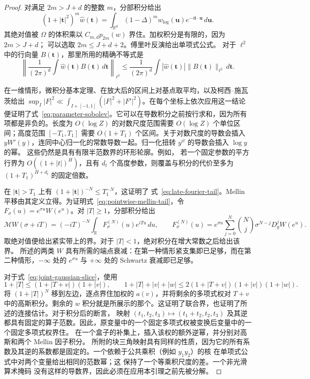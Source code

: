\documentclass[11pt,a4paper]{article}
\numberwithin{equation}{section}
\numberwithin{figure}{section}
\theoremstyle{definition}
\theoremstyle{remark}
\begin{document}
\begin{proof}
对满足 $2m>J+d$ 的整数 $m$，分部积分给出
\[
 (1+|\boldsymbol t|^2)^m\widehat w(\boldsymbol t)
 =\int_{\mathbb R^d}(1-\Delta)^m w_{\log}(\boldsymbol u)
                       e^{-i\boldsymbol t\cdot\boldsymbol u}\,d\boldsymbol u.
\]
其绝对值被 $\Omega$ 的体积乘以
$C_{m,d}p_{2m}(w)$ 界住。加权积分是有限的，因为 $2m>J+d$；
可以选取 $2m\le J+d+2$。傅里叶反演给出单项式公式。
对于 $\ell^2$ 中的行向量 $B(\boldsymbol t)$，那里所用的精确不等式是
\[
 \left\|\frac1{(2\pi)^d}\int\widehat w(\boldsymbol t)
                 B(\boldsymbol t)\,d\boldsymbol t\right\|_{\ell^2}
 \le\frac1{(2\pi)^d}\int|\widehat w(\boldsymbol t)|
                 \|B(\boldsymbol t)\|_{\ell^2}\,d\boldsymbol t.
\]

在一维情形，微积分基本定理、在放大后的区间上对基点取平均，以及柯西--施瓦茨给出
$\sup_I|F|^2\ll\int_{I+[-1,1]}(|F|^2+|F'|^2)$。在每个坐标上依次应用这一结论便证明了式~\eqref{eq:parameter-sobolev}。它可以在导数积分之前按行求和，因为所有项都是非负的。长度为 $O(\log Z)$ 的对数尺度范围需要
$O(\log Z)$ 个单位区间；高度范围 $[-T_1,T_1]$ 需要
$O(1+T_1)$ 个区间。关于对数尺度的导数会插入
$yW'(y)$，连同中心归一化的常数导数一起。归一化扭转 $y^{it}$ 的导数会插入 $\log y$ 的幂。
这些仍然是具有有限半范数界的环形轮廓。例如，
若一个固定参数的平方行界为 $O((1+|t|)^H)$，且有
$d_t$ 个高度参数，则覆盖与积分的代价至多为 $(1+T_1)^{H+d_t}$ 的固定倍数。

在 $|\boldsymbol t|>T_1$ 上有
$(1+|\boldsymbol t|)^{-N}\le T_1^{-N}$，这证明了
式~\eqref{eq:late-fourier-tail}。Mellin 平移由其定义立得。为证明式~\eqref{eq:pointwise-mellin-tail}，令
$F_\sigma(u)=e^{\sigma u}W(e^u)$。对 $|T|\ge1$，分部积分给出
\[
 \mathcal MW(\sigma+iT)=(-iT)^{-N}
              \int_{\mathbb R}F_\sigma^{(N)}(u)e^{iTu}\,du,
 \qquad
 F_\sigma^{(N)}(u)=e^{\sigma u}\sum_{j=0}^N
       \binom Nj\sigma^{N-j}D_y^jW(e^u).
\]
取绝对值便给出紧实带上的界。对于
$|T|<1$，绝对积分在增大常数之后给出该界。
所述的两类 $W$ 具有所需的端点衰减：在第一种情形紧支集即已足够，而在第二种情形，$-\infty$ 处的 $e^{\sigma u}$ 与 $+\infty$ 处的 Schwartz 衰减即已足够。

对于式~\eqref{eq:joint-gaussian-slice}，使用
\[
 1+|T|\le(1+|T+v|)(1+|v|),\qquad
 1+|T|+|v|+|w|\le2(1+|T+v|)(1+|v|)(1+|w|).
\]
将 $(1+|T|)^N$ 移到左边，逐点界住加权的 $a(v)$，并将剩余的多项式权对 $T+v$ 中的高斯积分。剩余的 $w$ 积分就是所展示的那个。这证明了联合界，也证明了所述的连接估计。对于积分后的断言，
映射 $(t_1,t_2,t_3)\mapsto(t_1+t_2,t_2,t_3)$ 及其逆都具有固定的算子范数。因此，原变量中的一个固定多项式权被变换后变量中的一个固定多项式权界住。
在一个盒子的补集上，插入该权的额外逆幂，并分别对高斯和两个 Mellin 因子积分。
所附的块三角映射具有同样的性质，因为它的所有系数及其逆的系数都是固定的。一个依赖于公共乘积（例如 $y_1y_2$）的核
在单项式公式中对两个变量给出相同的范数幂；这
保持了一个等乘积尺度的差。一个非光滑算术掩码
没有这样的导数界，因此必须在应用本引理之前先被分解。
\end{proof}
\end{document}
